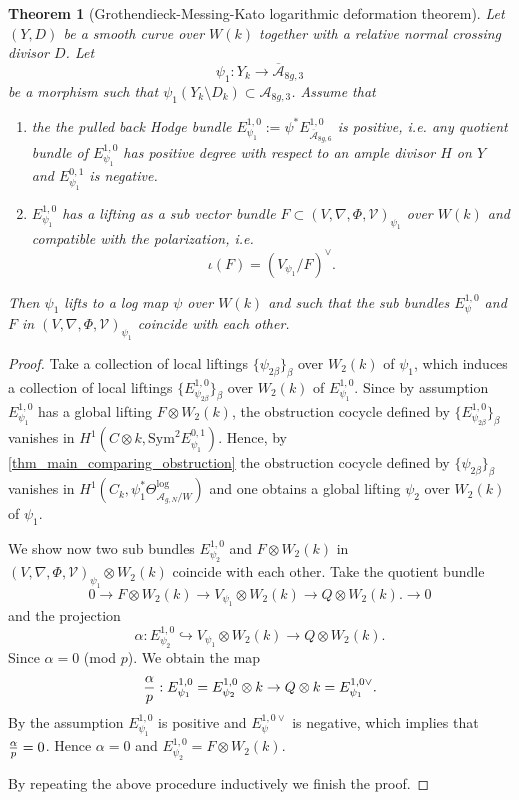 \documentclass[12pt,twoside]{book}
\theoremstyle{plain}
\newtheorem{theorem}{Theorem}[section]
\theoremstyle{definition}
\theoremstyle{remark}
\newcommand{\mA}{{\mathcal A}}
\numberwithin{equation}{section}
\begin{document}
\begin{theorem}[Grothendieck-Messing-Kato logarithmic deformation theorem] \label{thm_lifting_family_to_W}
Let $(Y,D)$ be a smooth curve over $W(k)$ together with a relative normal crossing divisor $D$. Let
\[\psi_1: Y_k \rightarrow \overline{\mA}_{8g,3}\]
be a morphism such that $\psi_1(Y_k\setminus D_k)\subset \mA_{8g,3}$. Assume that
\begin{enumerate}
\item the the pulled back Hodge bundle $E^{1,0}_{\psi_1}:=\psi^*E^{1,0}_{\overline{\mA}_{8g,6}}$ is positive, i.e. any quotient bundle of $E^{1,0}_{\psi_1}$ has positive degree with respect to an ample divisor $H$ on $Y$ and $E^{0,1}_{\psi_1}$ is negative.
\item $E^{1,0}_{\psi_1}$ has a lifting as a sub vector bundle $F\subset (V,\nabla,\Phi,\mathcal V)_{\psi_1}$ over $W(k)$ and compatible with the polarization, i.e.
\[\iota(F)=(V_{\psi_1}/F)^\vee.\]
\end{enumerate}
Then $\psi_1$ lifts to a log map $\psi$ over $W(k)$ and such that
the sub bundles $E^{1,0}_{\psi}$ and $F$ in $(V,\nabla,\Phi,\mathcal V)_{\psi_1}$ coincide with each other.
\end{theorem}
\begin{proof}
Take a collection of local liftings
$\{\psi_{2 \beta}\}_\beta$ over $W_2(k) $ of $\psi_1$, which induces a collection of local liftings
$\{E^{1,0}_{\psi_{2 \beta}}\}_\beta$ over $W_2(k)$ of $E^{1,0}_{\psi_1}$.
Since by assumption $E^{1,0}_{\psi_1}$ has a global lifting $F\otimes W_2(k)$,
the obstruction cocycle defined by $\{E^{1,0}_{\psi_{2 \beta}}\}_\beta$ vanishes in $H^1(C\otimes k,\mathrm{Sym}^2 E^{0,1}_{\psi_1}). $ Hence, by \autoref{thm_main_comparing_obstruction} the obstruction cocycle defined by $\{\psi_{2 \beta}\}_\beta$ vanishes in $H^1(C_k,\psi^*_1 \Theta^{\log}_{{\mathcal A_{g,N}}/W} )$ and one obtains a global lifting $\psi_2$ over $W_2(k)$ of $\psi_1$.

We show now two sub bundles $E^{1,0}_{\psi_2}$ and $F\otimes W_2(k)$ in $(V,\nabla,\Phi,\mathcal V)_{\psi_1}\otimes W_2(k)$ coincide with each other.
Take the quotient bundle
$$0\to F\otimes W_2(k)\to V_{\psi_1}\otimes W_2(k)\to Q\otimes W_2(k).\to 0$$
and the projection
$$\alpha: E^{1,0}_{\psi_2}\hookrightarrow V_{\psi_1}\otimes W_2(k)\to Q\otimes W_2(k).$$
Since $\alpha=0$ (mod $p$). We obtain the map
$${\alpha\over p}: E^{1,0}_{\psi_1}=E^{1,0}_{\psi_2}\otimes k\to Q\otimes k =E^{1,0\vee}_{\psi_1}.$$
By the assumption $E^{1,0}_{\psi_1}$ is positive and $E^{1,0\vee}_{\psi}$ is negative, which implies that
${\alpha\over p}=0$. Hence $\alpha=0$ and $E^{1,0}_{\psi_2}=F\otimes W_2(k)$.

By repeating the above procedure inductively we finish the proof.
\end{proof}
\end{document}

